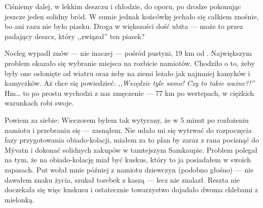 Ciśniemy dalej, w lekkim deszczu i chłodzie, do oporu, po drodze pokonując jeszcze jeden solidny bród. W sumie jednak końcówkę jechało się całkiem znośnie, bo ani razu nie było piasku. Droga w większości dość ubita --- może to przez padający deszcz, który ,,związał'' ten piasek?


Nocleg wypadł znów --- nie inaczej --- pośród pustyni, 19 km od . Największym problem okazało się wybranie miejsca na rozbicie namiotów. Chodziło o to, żeby były one osłonięte od wiatru oraz żeby na ziemi leżało jak najmniej kamyków i kamyczków. Aż chce się powiedzieć: \emph{,,Wszędzie tyle samo! Czy to takie ważne?!''} Hm… to po prostu wychodzi z nas zmęczenie --- 77 km po wertepach, w ciężkich warunkach robi swoje.

Powiem za siebie: Wieczorem byłem tak wytyrany, że w 5 minut po rozłożeniu namiotu i przebraniu się --- zasnąłem. Nie udało mi się wytrwać do rozpoczęcia fazy przygotowania obiado-kolacji, miałem za to plan by zaraz z rana pocisnąć do Mývatn i dokonać solidnych zakupów w tamtejszym Samkaupie. Problem polegał na tym, że na obiado-kolację miał być kuskus, który to ja posiadałem w swoich zapasach. Put wołał mnie później z namiotu dziewczyn (podobno głośno) --- nie dawałem znaku życia, szukał torebek z kaszą --- lecz nie znalazł. Reszta nie doczekała się więc kuskusu i ostatecznie towarzystwo dojadało dwoma chlebami z mielonką.

